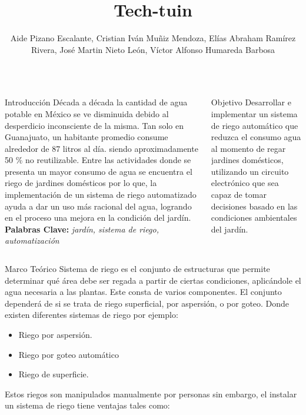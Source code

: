 \documentclass{beamer}
\title{Tech-tuin}
\author{Aide Pizano Escalante, Cristian Iván Muñiz Mendoza, Elías Abraham Ramírez Rivera, José Martin Nieto León, Víctor Alfonso Humareda Barbosa}
\institute{Ingeniería en Telemática}
\date{}
\begin{document}
\begin{frame}[fragile]{} 
\begin{columns}[t]
  \begin{column}{0.46\textwidth}
    \begin{block}{Introducción}\justifying
      Década a década la cantidad de agua potable en México se ve disminuida debido al desperdicio inconsciente de la misma. Tan solo en Guanajuato, un habitante promedio consume alrededor de 87 litros al día. siendo aproximadamente 50 \% no reutilizable. Entre las actividades donde se presenta un mayor consumo de agua se encuentra el riego de jardines domésticos por lo que, la implementación de un sistema de riego automatizado ayuda a dar un uso más racional del agua, logrando en el proceso una mejora en la condición del jardín.\\
      \textbf{Palabras Clave:} \textit{ jardín, sistema de riego, automatización}
     \end{block}
  \end{column}
  \begin{column}{0.46\textwidth}
    \begin{block}{Objetivo}\justifying
        Desarrollar e implementar un sistema de riego automático que reduzca el consumo
agua al momento de regar jardines domésticos, utilizando un circuito electrónico que sea
capaz de tomar decisiones basado en las condiciones ambientales del jardín. \\

    \end{block}
  \end{column}
\end{columns}


\justifying
\begin{columns}[t]
 \begin{column}{0.96\textwidth}
     \begin{block}{Marco Teórico}
           \vspace{0pt}
 Sistema de riego es el conjunto de estructuras que permite determinar qué área debe ser regada a partir de ciertas condiciones, aplicándole el agua necesaria a las plantas. Este consta de varios componentes. El conjunto dependerá de si se trata de riego superficial, por aspersión, o por goteo. Donde existen diferentes sistemas de riego por ejemplo:
\begin{itemize}
\item  Riego por aspersión.
\item  Riego por goteo automático
\item  Riego de superficie.
\end{itemize}
Estos riegos son manipulados manualmente por personas sin embargo, el instalar un sistema de riego tiene ventajas tales como:


\end{block}
\end{column}
\end{columns}
\end{frame}
\end{document}
